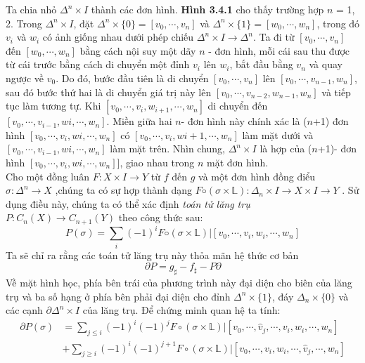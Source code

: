 \indent Ta chia nhỏ \(\Delta^{n} \times I\) thành các đơn hình. \textbf{Hình 3.4.1} cho thấy trường hợp \(n\) = 1, 2. Trong \(\Delta^{n} \times I\), đặt \(\Delta^{n} \times \{0\} = [v_0, \cdots , v_n]\) và \(\Delta^{n} \times \{1\} = [w_0, \cdots , w_n]\), trong đó \(v_i\) và \(w_i\) có ảnh giống nhau dưới phép chiếu \(\Delta^{n} \times I \rightarrow \Delta^n\). Ta đi từ \([v_0, \cdots , v_n]\) đến \([w_0, \cdots , w_n]\) bằng cách nội suy một dãy \(n\) - đơn hình, mỗi cái sau thu được từ cái trước bằng cách di chuyển một đỉnh \(v_i\) lên \(w_i\), bắt đầu bằng \(v_n\) và quay ngược về \(v_0\). Do đó, bước đầu tiên là di chuyển \([v_0, \cdots , v_n]\) lên \([v_0, \cdots , v_{n-1}, w_n]\), sau đó bước thứ hai  là  di  chuyển  giá  trị  này  lên  \([v_0, \cdots , v_{n-2}, w_{n-1}, w_n]\)  và  tiếp  tục  làm tương tự. Khi \([v_0, \cdots , v_i,w_{i+1}, \cdots, w_n]\) di chuyển đến \([v_0, \cdots , v_{i-1},wi, \cdots, w_n]\). Miền giữa hai \(n\)- đơn hình này chính xác là (\(n\)+1) đơn hình \([v_0, \cdots , v_i,wi, \cdots, w_n]\) có \([v_0, \cdots , v_i,w{i+1}, \cdots, w_n]\) làm mặt dưới  và \([v_0, \cdots , v_{i-1},wi, \cdots, w_n]\) làm  mặt  trên. Nhìn  chung, \(\Delta^n \times I\)  là  hợp  của  (\(n\)+1)- đơn hình \([v_0, \cdots , v_i,wi, \cdots, w_n]\)], giao nhau trong \(n\) mặt đơn hình. \\
\indent Cho một đồng luân \(F : X \times I \rightarrow Y\) từ \(f\) đến \(g\) và một đơn hình đồng điểu \(\sigma : \Delta^{n} \rightarrow X\) ,chúng ta có sự hợp thành dạng \(F ◦ (\sigma \times \mathds{L} ) : \Delta_{n} \times I \rightarrow X \times I \rightarrow Y\) . Sử dụng điều này, chúng ta có thể xác định \emph{toán tử lăng trụ} \(P : C_n(X)→C_{n+1}(Y)\) theo công thức sau: \\
\[P(\sigma) = \sum_{i} (-1)^{i}F◦(\sigma \times \mathds{L}) | [v_0, \cdots,v_i,w_i,\cdots,w_n]\]
\indent Ta sẽ chỉ ra rằng các toán tử lăng trụ này thỏa mãn hệ thức cơ bản \\
\[\partial P = g_{\sharp} - f_{\sharp} - P\partial\]
\indent Về mặt hình học, phía bên trái của phương trình này đại diện cho biên của lăng trụ và ba số hạng ở phía bên phải đại diện cho đỉnh \( \Delta^{n} \times \{1\}\), đáy \(\Delta_{n} \times \{0\}\) và các cạnh \(\partial \Delta^{n} \times I\) của lăng trụ. Để chứng minh quan hệ ta tính: \\
\begin{equation*}\label{eq:pareto mle2}
	\begin{aligned}
		\partial P(\sigma) & = \sum_{j \leq i}(-1)^{i}(-1)^{j}F\circ(\sigma \times \mathds{L}) | [v_0, \cdots, \hat{v}_j,\cdots,v_i,w_i,\cdots,w_n] \\
		& + \sum_{j \geq i}(-1)^{i}(-1)^{j+1}F\circ(\sigma \times \mathds{L}) | [v_0, \cdots, v_i,w_i,\cdots,\hat{v}_j,\cdots,w_n] \\
	\end{aligned}
\end{equation*} \\
